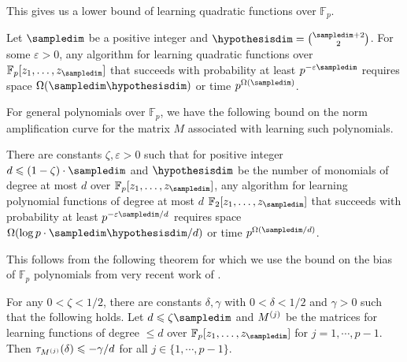 This gives us a lower bound of learning quadratic functions over $\mathbb{F}_p$.

\begin{corollary}
\label{cor:quadratic-complex}
Let $\sampledim$ be a positive integer and $\hypothesisdim=\binom{\sampledim+2}2$. For some $\varepsilon>0$,
any algorithm for learning quadratic functions over
$\mathbb{F}_p[z_1,\ldots, z_\sampledim]$ that succeeds with probability at least
$p^{-\varepsilon \sampledim}$ requires space $\Omega(\sampledim\hypothesisdim)$ or time $p^{\Omega(\sampledim)}$.
\end{corollary}



For general polynomials over $\mathbb{F}_p$,
we have the following bound on the norm amplification curve
for the matrix $M$ associated with learning such polynomials.

\begin{theorem}
\label{thm:smalld-complex}
There are constants $\zeta,\varepsilon >0$ such that for positive integer
$d\le (1-\zeta) \cdot \sampledim$ and $\hypothesisdim$ be the number of monomials of degree at most $d$ over
$\mathbb{F}_p[z_1,\ldots, z_\sampledim]$,
any algorithm for learning polynomial functions of degree at most $d$ 
$\mathbb{F}_2[z_1,\ldots, z_\sampledim]$ that succeeds with probability at least
$p^{-\varepsilon \sampledim/d}$ requires space $\Omega(\log p \cdot \sampledim\hypothesisdim/d)$ or
time $p^{\Omega(\sampledim/d)}$.
\end{theorem}

This follows  from the following theorem for which we use the bound on the bias of $\mathbb{F}_p$ polynomials from very recent work of
\cite{bogy:reedmuller-bias}.

\begin{theorem}
\label{thm:F2curve-complex}
For any $0<\zeta<1/2$, there are constants $\delta,\gamma$ with $0<\delta<1/2$ and
$\gamma>0$
such that the following holds.
Let $d\le \zeta \sampledim$ and 
$M^{(j)}$ be the matrices  for learning functions of degree
$\le d$ over $\mathbb{F}_p[z_1,\ldots, z_\sampledim]$ for $j=1,\cdots,p-1$.
Then $\tau_{M^{(j)}}(\delta)\leqslant -\gamma/d$ for all $j\in \{1,\cdots,p-1\}$.
\end{theorem}



